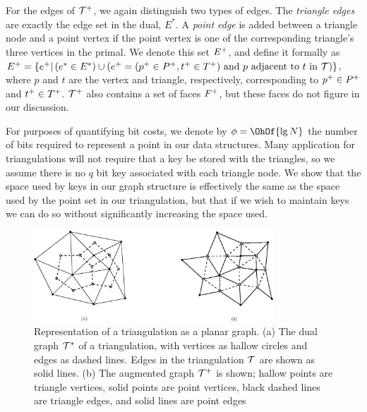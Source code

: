 {For the edges of $\mathcal{T}^+$, we again distinguish two types
 of edges. 
The \emph{triangle edges} are exactly the edge set in the dual, $E^*$. 
A \emph{point edge} is added between a triangle node and a point vertex
 if the point vertex is one of the corresponding triangle's three vertices in 
 the primal. 
We denote this set $E^+$, and define it formally as
$E^+ = \{e^+ | \left( e^* \in E^* \right)
 \cup \left( e^+=( p^+ \in P^+, 
  t^+ \in T^+ ) \text{ and } p 
  \text{ adjacent to } t \text{ in } \mathcal{T} \right) \} $,
where $p$ and $t$ are the vertex and triangle, respectively, corresponding to 
$p^+ \in P^+$ and $t^{+} \in T^{+}$. 
$\mathcal{T}^+$ also contains a set of faces $F^{+}$, but these faces 
do not figure in our discussion. 


For purposes of quantifying bit costs, we denote by $\bitsPerPoint = \OhOf{\lg{N}}$ 
the number of bits required to represent a point in our data structures. 
Many application for triangulations will not require that a key be stored 
with the triangles, so we assume there is no $q$ bit key associated 
with each triangle node. 
We show that the space used by keys in our graph structure is effectively 
the same as the space used by the point set in our triangulation, but that 
if we wish to maintain keys we can do so without significantly increasing 
the space used.

\begin{figure}
\centering
	\includegraphics[width=0.8\textwidth]{Fig4}
\caption[Representation of a triangulation as a planar graph]{Representation 
	of a triangulation as a planar graph. 
  (a) The dual graph $\mathcal{T}^*$ of a triangulation, with vertices as hallow 
circles and edges as dashed lines. 
Edges in the triangulation $\mathcal{T}$ are shown as solid lines. 
(b) The augmented graph $\mathcal{T}^+$ is shown;
hallow points are triangle vertices, solid points are point 
vertices, black dashed lines are triangle edges, and solid lines are point 
edges }\label{fig:aug_tri}
\end{figure}

}
